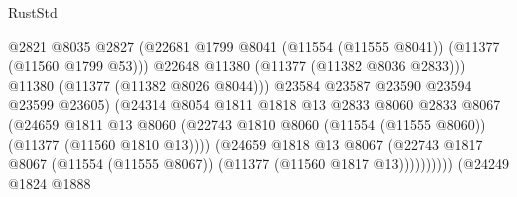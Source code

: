 \begin{lexlean}{RustStd}
\begin{coremodule}
                                              @2821
                                              @8035
                                              @2827
                                              (@22681
                                                @1799
                                                @8041
                                                (@11554 (@11555 @8041))
                                                (@11377 (@11560 @1799 @53)))
                                              @22648
                                              @11380
                                              (@11377 (@11382 @8036 @2833)))
                                            @11380
                                            (@11377 (@11382 @8026 @8044)))
                                          @23584
                                          @23587
                                          @23590
                                          @23594
                                          @23599
                                          @23605)
                                        (@24314
                                          @8054
                                          @1811
                                          @1818
                                          @13
                                          @2833
                                          @8060
                                          @2833
                                          @8067
                                          (@24659
                                            @1811
                                            @13
                                            @8060
                                            (@22743
                                              @1810
                                              @8060
                                              (@11554 (@11555 @8060))
                                              (@11377 (@11560 @1810 @13))))
                                          (@24659
                                            @1818
                                            @13
                                            @8067
                                            (@22743
                                              @1817
                                              @8067
                                              (@11554 (@11555 @8067))
                                              (@11377 (@11560 @1817 @13))))))))))
                              (@24249
                                @1824
                                @1888

\end{coremodule}
\end{lexlean}
